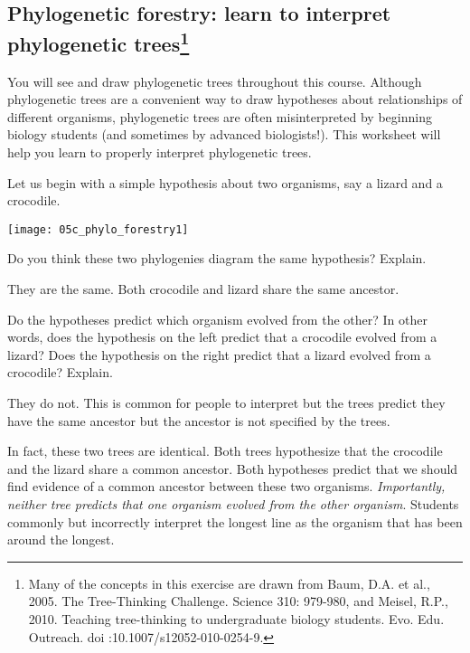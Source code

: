\documentclass[12pt, hidelinks]{exam}
\newcommand*\AnswerBox[2]{%
    \parbox[t][#1]{0.92\textwidth}{%
    \begin{solution}#2\end{solution}}
    \vspace{\stretch{1}}
}
\begin{document}
\subsection*{Phylogenetic forestry: learn to interpret phylogenetic trees\footnote{Many of the concepts in this exercise are drawn from Baum, D.A. et al., 2005. The Tree-Thinking Challenge. Science 310: 979-980, and Meisel, R.P., 2010. Teaching tree-thinking to undergraduate biology students. Evo. Edu. Outreach. doi :10.1007/s12052-010-0254-9.}}

You will see and draw phylogenetic trees throughout this course.
Although phylogenetic trees are a convenient way to draw hypotheses about
relationships of different organisms, phylogenetic trees are often
misinterpreted by beginning biology students (and sometimes by advanced
biologists!). This worksheet will help you learn to properly interpret
phylogenetic trees.

Let us begin with a simple hypothesis about two organisms, say a lizard
and a crocodile. %

\begin{center}%
	\noindent\texttt{[image: 05c\_phylo\_forestry1]}
\end{center}

\begin{questions}

\question
Do you think these two phylogenies diagram the same
hypothesis? Explain.

\AnswerBox{3\baselineskip}{They are the same. Both crocodile and lizard
share the same ancestor.}

\question
Do the hypotheses predict which organism evolved from the
other? In other words, does the hypothesis on the left predict that a
crocodile evolved from a lizard? Does the hypothesis on the right
predict that a lizard evolved from a crocodile? Explain.

\AnswerBox{3\baselineskip}{They do not. This is common for people to 
interpret but the trees predict they have the same ancestor but the ancestor
is not specified by the trees.}

\end{questions}

In fact, these two trees are identical. Both trees hypothesize that the
crocodile and the lizard share a common ancestor. Both hypotheses
predict that we should find evidence of a
common ancestor between these two organisms. \emph{Importantly, neither
tree predicts that one organism evolved from the other organism}.
Students commonly but incorrectly interpret the longest line as the organism that has
been around the longest.
\end{document}
